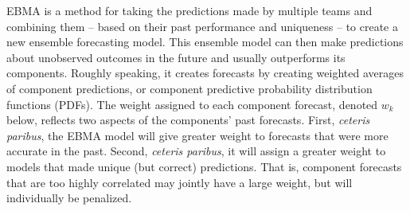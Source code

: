 \documentclass[12pt,fullpage,endnotes]{article}
\begin{document}
EBMA is a method for taking the predictions made by multiple teams and
combining them -- based on their past performance and uniqueness -- to
create a new ensemble forecasting model.  This ensemble model can then
make predictions about unobserved outcomes in the future and usually
outperforms its components.  Roughly speaking, it creates forecasts by
creating weighted averages of component predictions, or component
predictive probability distribution functions (PDFs).  The weight
assigned to each component forecast, denoted $w_k$ below, reflects two
aspects of the components' past forecasts.  First, \textit{ceteris
  paribus}, the EBMA model will give greater weight to forecasts that
were more accurate in the past.  Second, \textit{ceteris paribus}, it
will assign a greater weight to models that made unique (but correct)
predictions.  That is, component forecasts that are too highly
correlated may jointly have a large weight, but will individually be
penalized.
\end{document}

